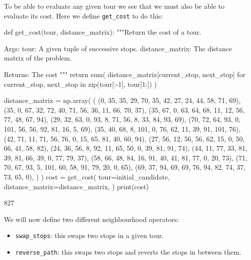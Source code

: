 \begin{pyout}
[0, 7, 12, 5, 11, 3, 9, 2, 8, 10, 4, 1, 6, 0]
\end{pyout}

To be able to evaluate any given tour we see that we must also be able to
evaluate its cost. Here we define \texttt{get_cost} to do this:

\begin{pyin}
def get_cost(tour, distance_matrix):
    """Return the cost of a tour.

    Args:
        tour: A given tuple of successive stops.
        distance_matrix: The distance matrix of the problem.

    Returns:
        The cost
    """
    return sum(
        distance_matrix[current_stop, next_stop]
        for current_stop, next_stop in zip(tour[:-1], tour[1:])
    )
\end{pyin}

\begin{pyin}
distance_matrix = np.array(
    (
        (0, 35, 35, 29, 70, 35, 42, 27, 24, 44, 58, 71, 69),
        (35, 0, 67, 32, 72, 40, 71, 56, 36, 11, 66, 70, 37),
        (35, 67, 0, 63, 64, 68, 11, 12, 56, 77, 48, 67, 94),
        (29, 32, 63, 0, 93, 8, 71, 56, 8, 33, 84, 93, 69),
        (70, 72, 64, 93, 0, 101, 56, 56, 92, 81, 16, 5, 69),
        (35, 40, 68, 8, 101, 0, 76, 62, 11, 39, 91, 101, 76),
        (42, 71, 11, 71, 56, 76, 0, 15, 65, 81, 40, 60, 94),
        (27, 56, 12, 56, 56, 62, 15, 0, 50, 66, 41, 58, 82),
        (24, 36, 56, 8, 92, 11, 65, 50, 0, 39, 81, 91, 74),
        (44, 11, 77, 33, 81, 39, 81, 66, 39, 0, 77, 79, 37),
        (58, 66, 48, 84, 16, 91, 40, 41, 81, 77, 0, 20, 73),
        (71, 70, 67, 93, 5, 101, 60, 58, 91, 79, 20, 0, 65),
        (69, 37, 94, 69, 69, 76, 94, 82, 74, 37, 73, 65, 0),
    )
)
cost = get_cost(
    tour=initial_candidate,
    distance_matrix=distance_matrix,
)
print(cost)
\end{pyin}

\begin{pyout}
827
\end{pyout}

We will now define two different neighbourhood operators:

\begin{itemize}
    \item \texttt{swap_stops}: this swaps two stops in a given tour.
    \item \texttt{reverse_path}: this swaps two stops and reverts the
        stops in between them.
\end{itemize}

